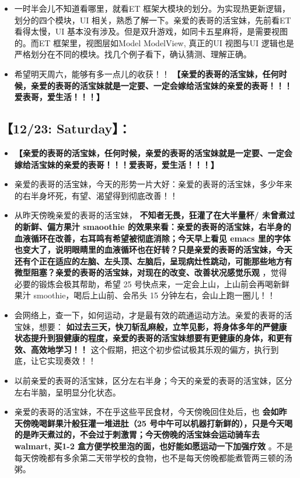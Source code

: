 \documentclass[9pt, b5paper]{article}
\begin{document}
\begin{itemize}
\item 一时半会儿不知道看哪里，就看ET 框架大模块的划分。为实现热更新逻辑，划分的四个模块，UI 相关，熟悉了解一下。亲爱的表哥的活宝妹，先前看ET 看得太慢，UI 基本没有涉及。但是双升游戏，如同卡五星麻将，是需要视图的。而ET 框架里，视图层如Model ModelView, 真正的UI 视图与UI 逻辑也是严格划分在不同的模块。找几个例子看下，确认猜测、理解正确。
\item 希望明天周六，能够有多一点儿的收获！！ \textbf{【亲爱的表哥的活宝妹，任何时候，亲爱的表哥的活宝妹就是一定要、一定会嫁给活宝妹的亲爱的表哥！！！爱表哥，爱生活！！！】}
\end{itemize}
\subsection{【12/23: Saturday】：}
\label{sec-2-6}
\begin{itemize}
\item \textbf{【亲爱的表哥的活宝妹，任何时候，亲爱的表哥的活宝妹就是一定要、一定会嫁给活宝妹的亲爱的表哥！！！爱表哥，爱生活！！！】}
\item 亲爱的表哥的活宝妹，今天的形势一片大好：亲爱的表哥的活宝妹，多少年来的右半身坏死，有望、渴望得到彻底改善！！
\item 从昨天傍晚亲爱的表哥的活宝妹， \textbf{不知者无畏，狂灌了在大半量杯/ 未曾煮过的新鲜、偏方果汁 smaoothie 的效果来看：亲爱的表哥的活宝妹，右半身的血液循环在改善，右耳鸣有希望被彻底消除；今天早上看见 emacs 里的字体也变大了，说明眼睛里的血液循环也在好转？只是亲爱的表哥的活宝妹，今天还有个正在适应的左脑、左头顶、左脑后，呈现病灶性跳动，可能那些地方有微型阻塞？亲爱的表哥的活宝妹，对现在的改变、改善状况感觉乐观} ，觉得必要的锻炼会极其帮助，希望 25 号快点来，一定会上山，上山前会再喝新鲜果汁 smoothie，喝后上山前、会吊头 15 分钟左右，会山上跑一圈儿！！
\item 会网络上，查一下，如何运动，才是最有效的疏通运动方法。亲爱的表哥的活宝妹，想要： \textbf{如过去三天，快刀斩乱麻般，立竿见影，将身体多年的严健康状态提升到狠健康的程度，亲爱的表哥的活宝妹想要有更健康的身体，和更有效、高效地学习！！} 这个假期，把这个初步偿试极其乐观的偏方，执行到底，让它实现奏效！！
\item 以前亲爱的表哥的活宝妹，区分左右半身；今天的亲爱的表哥的活宝妹，区分左右半脑，呈明显分化状态。
\item 亲爱的表哥的活宝妹，不在乎这些平民食材，今天傍晚回住处后，也 \textbf{会如昨天傍晚喝鲜果汁般狂灌一堆进肚（25 号中午可以机器打新鲜的），只是今天喝的是昨天煮过的，不会过于刺激胃；今天傍晚的活宝妹会运动骑车去 walmart, 买1-2 盒方便学校里泡的面，也好能如愿运动一下加强疗效} 。不是每天傍晚都有多余第二天带学校的食物，也不是每天傍晚都能煮管两三顿的汤粥。

\end{itemize}
\end{document}

